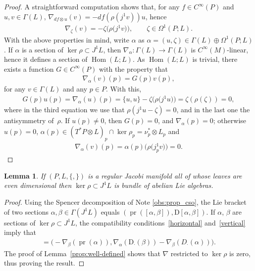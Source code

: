 \documentclass[pdftex]{sigma}
\numberwithin{equation}{section}
\newtheorem{Lemma}[Theorem]{Lemma}
\newcommand{\pr}{\operatorname{pr}}
\renewcommand{\hom}{\operatorname{Hom}}
\begin{document}
\begin{proof}
A straightforward computation shows that, for any $f \in C^{\infty}(P)$ and $u,v \in \Gamma(L)$, $\nabla_{df\otimes u}(v)=-df(\rho(j^1v))u$, hence
\begin{gather*}\nabla_\zeta(v)=-\zeta\big(\rho\big(j^1v\big)\big), \qquad \zeta\in\Omega^1(P;L).\end{gather*}
With the above properties in mind, write $\alpha$ as $\alpha=(u,\zeta)\in\Gamma(L)\oplus\Omega^1(P;L)$. If $\alpha$ is a section of $\ker\rho\subset J^1L$, then $\nabla_\alpha\colon \Gamma(L)\to\Gamma(L)$ is $C^{\infty}(M)$-linear, hence it def\/ines a section of $\hom(L;L)$. As $\hom(L;L)$ is trivial, there exists a function $G\in C^\infty(P)$ with the property that
\begin{gather*}\nabla_\alpha(v)(p)=G(p)v(p),\end{gather*}
for any $v\in\Gamma(L)$ and any $p\in P$. With this,
\begin{gather*}G(p)u(p)=\nabla_\alpha(u)(p)=\{u,u\}-\zeta\big(\rho\big(j^1u\big)\big)=\zeta(\rho(\zeta))=0,\end{gather*}
where in the third equation we use that $\rho(j^1u-\zeta)=0$, and in the last one the antisymmetry of~$\rho$. If $u(p)\neq 0$, then $G(p)=0$, and $\nabla_\alpha(p)=0$; otherwise $u(p)=0$, $\alpha(p)\in (T^*P\otimes L)_p\cap\ker\rho_p=\nu^*_p\otimes L_p$ and
\begin{gather*}\nabla_\alpha(v)(p)=\alpha(p)\big(\rho\big(j^1_pv\big)\big)=0.\tag*{\qed}\end{gather*}\renewcommand{\qed}{}
\end{proof}

\begin{Lemma}\label{lemma:abelian}
If $(P,L,\{,\})$ is a regular Jacobi manifold all of whose leaves are even dimensional then $\ker\rho\subset J^1L$ is bundle of abelian Lie algebras.
\end{Lemma}

\begin{proof} Using the Spencer decomposition of Note \ref{obs:prop_cso}, the Lie bracket of two sections $\alpha,\beta\in\Gamma(J^1L)$ equals $(\pr([\alpha,\beta]),\mathrm{D}[\alpha,\beta])$. If $\alpha$, $\beta$ are sections of $\ker\rho\subset J^1L$, the compatibility conditions~\eqref{horizontal} and~\eqref{vertical} imply that
 \begin{gather*}
 [\alpha,\beta]=\big({-}\nabla_\beta(\pr(\alpha)), \nabla_\alpha (\mathrm{D}_\cdot(\beta))-\nabla_\beta(D_{\cdot}(\alpha))\big).
 \end{gather*}
The proof of Lemma~\ref{prop:well-defined} shows that $\nabla$ restricted to $\ker\rho$ is zero, thus proving the result.
\end{proof}
\end{document}
